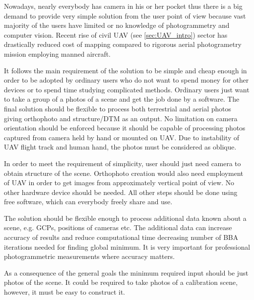 \documentclass[a4paper,12pt]{article}
\begin{document}
Nowadays, nearly everybody has camera in his or her pocket thus there is a big demand 
to provide very simple solution from the user point of view because 
vast majority of the users have limited or no knowledge of photogrammetry and computer vision. 
 Recent rise of civil UAV (see \ref{sec:UAV_intro}) sector has drastically reduced cost of mapping   
  compared to rigorous aerial photogrametry mission employing manned aircraft.


It follows the main requirement 
of the solution to be simple and cheap enough
in order to be adopted by
ordinary users who do not want 
to spend money for other devices or to spend time studying complicated methods. 
Ordinary users just 
want to take a group of a photos of a scene and get the job done by a software.
The final solution should be flexible to process both terrestrial and aerial photos
giving orthophoto and structure/DTM as an output. 
No limitation on camera orientation should be enforced because it should be capable 
of processing photos captured from camera held by hand or mounted on UAV.
Due to instability of UAV flight track and human hand, the photos 
must be considered as oblique. 


In order to meet the requirement of simplicity, user should just need  
 camera to obtain structure of the scene. Orthophoto creation would also need employment of UAV
in order to get images from approximately vertical point of view.
No other hardware device should be needed. 
All other steps should be done 
using free software, which can everybody freely share and use. 


The solution should be flexible enough to process additional data known about a scene, 
e.g. GCPs, positions of cameras etc. The additional data can
 increase accuracy of results and reduce computational time  
 decreasing number of  BBA iterations needed for finding global minimum. It is very important 
 for professional photogrammetric measurements where accuracy matters.

As a consequence of the general goals the minimum required input should be just photos
of the scene.
It could be required to take photos of a calibration scene, however, 
it must be easy to construct it. 
\end{document}
